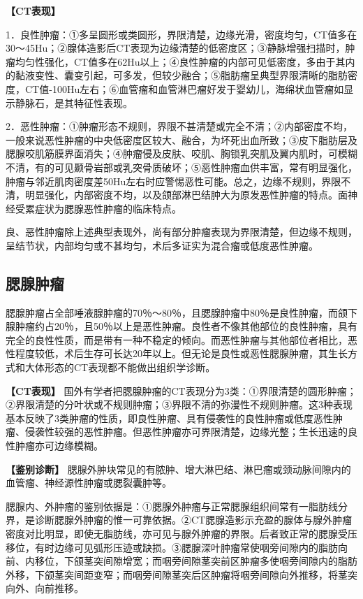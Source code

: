 \textbf{【CT表现】}

1．良性肿瘤：①多呈圆形或类圆形，界限清楚，边缘光滑，密度均匀，CT值多在30～45Hu；②腺体造影后CT表现为边缘清楚的低密度区；③静脉增强扫描时，肿瘤均匀性强化，CT值多在62Hu以上；④良性肿瘤的内部可见低密度，多由于其内的黏液变性、囊变引起，可多发，但较少融合；⑤脂肪瘤呈典型界限清晰的脂肪密度，CT值-100Hu左右；⑥血管瘤和血管淋巴瘤好发于婴幼儿，海绵状血管瘤如显示静脉石，是其特征性表现。

2．恶性肿瘤：①肿瘤形态不规则，界限不甚清楚或完全不清；②内部密度不均，一般来说恶性肿瘤的中央低密度区较大、融合，为坏死出血所致；③皮下脂肪层及腮腺咬肌筋膜界面消失；④肿瘤侵及皮肤、咬肌、胸锁乳突肌及翼内肌时，可模糊不清，有的可见颞骨岩部或乳突骨质破坏；⑤恶性肿瘤血供丰富，常有明显强化，肿瘤与邻近肌肉密度差50Hu左右时应警惕恶性可能。总之，边缘不规则，界限不清，明显强化，内部密度不均，以及颌部淋巴结肿大为原发恶性肿瘤的特点。面神经受累症状为腮腺恶性肿瘤的临床特点。

良、恶性肿瘤除上述典型表现外，尚有部分肿瘤表现为界限清楚，但边缘不规则，呈结节状，内部均匀或不甚均匀，术后多证实为混合瘤或低度恶性肿瘤。

\subsection{腮腺肿瘤}

腮腺肿瘤占全部唾液腺肿瘤的70％～80％，且腮腺肿瘤中80％是良性肿瘤，而颌下腺肿瘤约占20％，且50％以上是恶性肿瘤。良性者不像其他部位的良性肿瘤，具有完全的良性性质，而是带有一种不稳定的倾向。而恶性肿瘤与其他部位者相比，恶性程度较低，术后生存可长达20年以上。但无论是良性或恶性腮腺肿瘤，其生长方式和大体形态的CT表现都不能做出组织学诊断。

\textbf{【CT表现】}
国外有学者把腮腺肿瘤的CT表现分为3类：①界限清楚的圆形肿瘤；②界限清楚的分叶状或不规则肿瘤；③界限不清的弥漫性不规则肿瘤。这3种表现基本反映了3类肿瘤的性质，即良性肿瘤、具有侵袭性的良性肿瘤或低度恶性肿瘤、侵袭性较强的恶性肿瘤。但恶性肿瘤亦可界限清楚，边缘光整；生长迅速的良性肿瘤亦可边缘模糊。

\textbf{【鉴别诊断】}
腮腺外肿块常见的有脓肿、增大淋巴结、淋巴瘤或颈动脉间隙内的血管瘤、神经源性肿瘤或腮裂囊肿等。

腮腺内、外肿瘤的鉴别依据是：①腮腺外肿瘤与正常腮腺组织间常有一脂肪线分界，是诊断腮腺外肿瘤的惟一可靠依据。②CT腮腺造影示充盈的腺体与腺外肿瘤密度对比明显，即使无脂肪线，亦可见与腺外肿瘤的界限。后者致正常的腮腺受压移位，有时边缘可见弧形压迹或缺损。③腮腺深叶肿瘤常使咽旁间隙内的脂肪向前、内移位，下颌茎突间隙增宽；而咽旁间隙茎突前区肿瘤多使咽旁间隙内的脂肪外移，下颌茎突间距变窄；而咽旁间隙茎突后区肿瘤将咽旁间隙向外推移，将茎突向外、向前推移。

